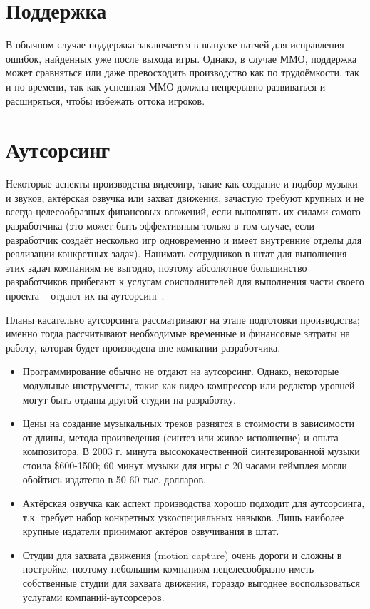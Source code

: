 \section{Поддержка}
В обычном случае поддержка заключается в выпуске патчей для исправления ошибок, найденных уже после выхода
игры. Однако, в случае ММО, поддержка может сравняться или даже превосходить производство как по
трудоёмкости, так и по времени, так как успешная ММО должна непрерывно развиваться и расширяться, чтобы
избежать оттока игроков.

\section{Аутсорсинг}
Некоторые аспекты производства видеоигр, такие как создание и подбор музыки и звуков, актёрская озвучка или
захват движения, зачастую требуют крупных и не всегда целесообразных финансовых вложений, если выполнять их
силами самого разработчика (это может быть эффективным только в том случае, если разработчик создаёт
несколько игр одновременно и имеет внутренние отделы для реализации конкретных задач). Нанимать сотрудников
в штат для выполнения этих задач компаниям не выгодно, поэтому абсолютное большинство разработчиков
прибегают к услугам соисполнителей для выполнения части своего проекта -- отдают их на аутсорсинг
\cite{1.8,1.9}.

Планы касательно аутсорсинга рассматривают на этапе подготовки производства; именно тогда рассчитывают
необходимые временные и финансовые затраты на работу, которая будет произведена вне компании-разработчика.
\begin{itemize}
    \item Программирование обычно не отдают на аутсорсинг. Однако, некоторые модульные инструменты, такие
        как видео-компрессор или редактор уровней могут быть отданы другой студии на разработку.
    \item Цены на создание музыкальных треков разнятся в стоимости в зависимости от длины, метода
        произведения (синтез или живое исполнение) и опыта композитора. В 2003 г. минута высококачественной
        синтезированной музыки стоила \$600-1500; 60 минут музыки для игры с 20 часами геймплея могли
        обойтись издателю в 50-60 тыс. долларов\cite{1.11}.
    \item Актёрская озвучка как аспект производства хорошо подходит для аутсорсинга, т.к. требует набор
        конкретных узкоспециальных навыков. Лишь наиболее крупные издатели принимают актёров озвучивания в
        штат.
    \item Студии для захвата движения (motion capture) очень дороги и сложны в постройке, поэтому небольшим
        компаниям нецелесообразно иметь собственные студии для захвата движения, гораздо выгоднее воспользоваться услугами компаний-аутсорсеров.
\end{itemize}

